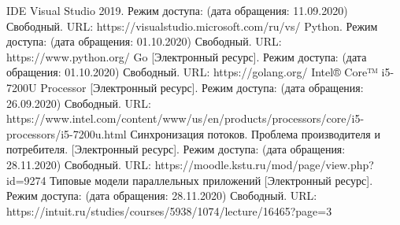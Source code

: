 


	
	\begin{center}
	\begin{thebibliography}{3}
	IDE Visual Studio 2019. Режим доступа: (дата обращения: 11.09.2020) Свободный. URL: https://visualstudio.microsoft.com/ru/vs/
	Python. Режим доступа: (дата обращения: 01.10.2020) Свободный. URL: https://www.python.org/
	Go [Электронный ресурс]. Режим доступа: (дата обращения: 01.10.2020) Свободный. URL: https://golang.org/
	Intel® Core™ i5-7200U Processor [Электронный ресурс]. Режим доступа: (дата обращения: 26.09.2020) Свободный. URL: https://www.intel.com/content/www/us/en/products/processors/core/i5-processors/i5-7200u.html
	Синхронизация потоков. Проблема производителя и потребителя. [Электронный ресурс]. Режим доступа: (дата обращения: 28.11.2020) Свободный. URL: https://moodle.kstu.ru/mod/page/view.php?id=9274
	Типовые модели параллельных приложений [Электронный ресурс]. Режим доступа: (дата обращения: 28.11.2020) Свободный. URL: https://intuit.ru/studies/courses/5938/1074/lecture/16465?page=3

	\end{thebibliography}
	\end{center}